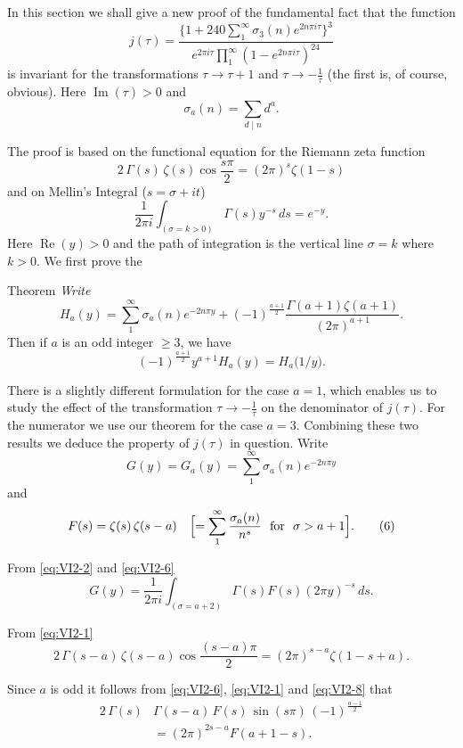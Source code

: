 In this section we shall give a new proof of the fundamental fact that
the function
\[
j(\tau)=\frac{\bigl\{1+240\sum_{1}^{\infty}\sigma_{3}(n)e^{2n\pi i\tau}\bigr\}^{3}}
{e^{2\pi i\tau}\prod_{1}^{\infty}(1-e^{2n\pi i\tau})^{24}}
\]
is invariant for the transformations $\tau\longrightarrow\tau+1$ and
$\tau\longrightarrow -\frac{1}{\tau}$ (the first is, of course, obvious).
Here $\operatorname{Im}(\tau)>0$ and
\[
\sigma_{a}(n)=\sum_{d\mid n}d^{a}.
\]

The proof is based on the functional equation for the Riemann zeta
function
\[
2\,\Gamma(s)\,\zeta(s)\cos\frac{s\pi}{2}=(2\pi)^{s}\zeta(1-s)
\tag{1}\label{eq:VI2-1}
\]
and on Mellin's Integral ($s=\sigma+it$)
\[
\frac{1}{2\pi i}\int_{(\sigma=k>0)}\Gamma(s)y^{-s}\,ds=e^{-y}.
\tag{2}\label{eq:VI2-2}
\]
Here $\operatorname{Re}(y)>0$ and the path of integration is the vertical
line $\sigma=k$ where $k>0$. We first prove the

\begin{namedstmt}{Theorem}
\emph{Write
\[
H_{a}(y)=\sum_{1}^{\infty}\sigma_{a}(n)e^{-2n\pi y}
+(-1)^{\frac{a+1}{2}}\frac{\Gamma(a+1)\zeta(a+1)}{(2\pi)^{a+1}}.
\tag{3}\label{eq:VI2-3}
\]}
Then if $a$ is an odd integer $\geq 3$, we have
\[
(-1)^{\frac{a+1}{2}}y^{a+1}H_{a}(y)=H_{a}\bigl(1/y\bigr).
\tag{4}\label{eq:VI2-4}
\]
\end{namedstmt}

There is a slightly different formulation for the case $a=1$, which
enables us to study the effect of the transformation
$\tau\longrightarrow -\frac{1}{\tau}$ on the denominator of $j(\tau)$.
For the numerator we use our theorem for the case $a=3$. Combining these
two results we deduce the property of $j(\tau)$ in question. Write
\[
G(y)=G_{a}(y)=\sum_{1}^{\infty}\sigma_{a}(n)e^{-2n\pi y}
\tag{5}\label{eq:VI2-5}
\]
and
\[
F(s)=\zeta(s)\,\zeta(s-a)\quad\Bigl[=\sum_{1}^{\infty}\frac{\sigma_{a}(n)}{n^{s}}
\text{\ \ for\ \ }\sigma>a+1\Bigr].
\tag{6}\label{eq:VI2-6}
\]

From \eqref{eq:VI2-2} and \eqref{eq:VI2-6}
\[
G(y)=\frac{1}{2\pi i}\int_{(\sigma=a+2)}\Gamma(s)F(s)(2\pi y)^{-s}\,ds.
\tag{7}\label{eq:VI2-7}
\]

From \eqref{eq:VI2-1}
\[
2\,\Gamma(s-a)\,\zeta(s-a)\cos\frac{(s-a)\pi}{2}=(2\pi)^{s-a}\zeta(1-s+a).
\tag{8}\label{eq:VI2-8}
\]

Since $a$ is odd it follows from \eqref{eq:VI2-6}, \eqref{eq:VI2-1} and
\eqref{eq:VI2-8} that
\[
\begin{aligned}
2\,\Gamma(s)&\Gamma(s-a)\,F(s)\,\sin(s\pi)\,(-1)^{\frac{a-1}{2}}\\
&=(2\pi)^{2s-a}F(a+1-s).
\end{aligned}
\tag{9}\label{eq:VI2-9}
\]

